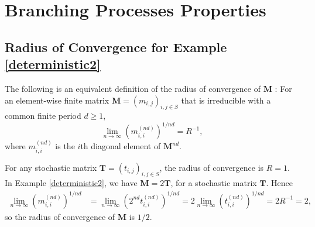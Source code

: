 \documentclass[preprint,3p,12pt]{elsarticle}
\theoremstyle{definition}
\begin{document}
\section{Branching Processes Properties}
\subsection{Radius of Convergence for Example \ref{deterministic2}} \label{radius_convergence}

The following is an equivalent definition of the radius of convergence of $\boldsymbol{M}$ \cite[Corollary of Theorem 6.1]{seneta}: For an element-wise finite matrix $\boldsymbol{M} = (m_{i,j})_{i,j \in S}$ that is irreducible with a common finite period $d \ge 1$,
\begin{equation*}
    \lim_{n \rightarrow \infty} (m_{i,i}^{(nd)})^{1/nd} = R^{-1},
\end{equation*}
where $m_{i,i}^{(nd)}$ is the $i$th diagonal element of $\boldsymbol{M}^{nd}$.

For any stochastic matrix $\boldsymbol{T}=(t_{i,j})_{i,j \in S}$, the radius of convergence is $R=1$. In Example \ref{deterministic2}, we have $\boldsymbol{M}=2 \boldsymbol{T}$, for a stochastic matrix $\boldsymbol{T}$. Hence
\begin{align*}
    \lim_{n \rightarrow \infty} (m_{i,i}^{(nd)})^{1/nd} &= \lim_{n \rightarrow \infty} (2^{nd} t_{i,i}^{(nd)})^{1/nd} = 2\lim_{n \rightarrow \infty} (t_{i,i}^{(nd)})^{1/nd} = 2 R^{-1} = 2,
\end{align*}
so the radius of convergence of $\boldsymbol{M}$ is $1/2$.
\end{document}
